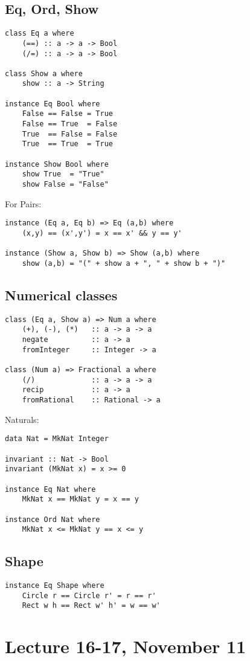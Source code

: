 \documentclass{article}
\begin{document}
\subsection{Eq, Ord, Show}
\begin{verbatim}
class Eq a where
    (==) :: a -> a -> Bool
    (/=) :: a -> a -> Bool

class Show a where
    show :: a -> String

instance Eq Bool where
    False == False = True
    False == True  = False
    True  == False = False
    True  == True  = True

instance Show Bool where
    show True  = "True"
    show False = "False"
\end{verbatim}
For Pairs:
\begin{verbatim}
instance (Eq a, Eq b) => Eq (a,b) where
    (x,y) == (x',y') = x == x' && y == y'

instance (Show a, Show b) => Show (a,b) where
    show (a,b) = "(" + show a + ", " + show b + ")"
\end{verbatim}
\subsection{Numerical classes}
\begin{verbatim}
class (Eq a, Show a) => Num a where
    (+), (-), (*)   :: a -> a -> a
    negate          :: a -> a
    fromInteger     :: Integer -> a

class (Num a) => Fractional a where
    (/)             :: a -> a -> a
    recip           :: a -> a
    fromRational    :: Rational -> a
\end{verbatim}
Naturals:
\begin{verbatim}
data Nat = MkNat Integer

invariant :: Nat -> Bool
invariant (MkNat x) = x >= 0

instance Eq Nat where
    MkNat x == MkNat y = x == y

instance Ord Nat where
    MkNat x <= MkNat y == x <= y
\end{verbatim}
\subsection{Shape}
\begin{verbatim}
instance Eq Shape where
    Circle r == Circle r' = r == r'
    Rect w h == Rect w' h' = w == w'
\end{verbatim}
\section{Lecture 16-17, November 11}
\end{document}
